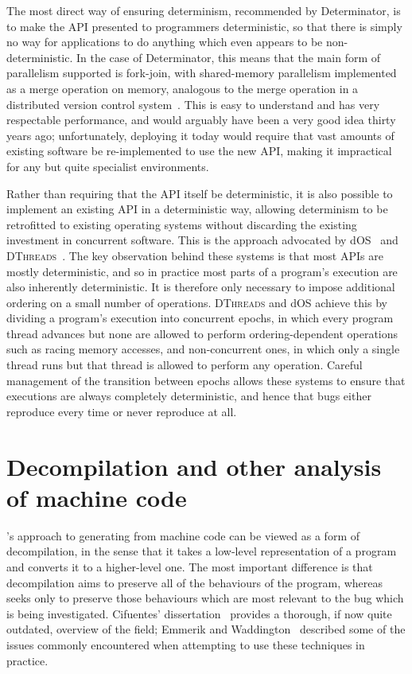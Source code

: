 The most direct way of ensuring determinism, recommended by
Determinator, is to make the API presented to programmers
deterministic, so that there is simply no way for applications to do
anything which even appears to be non-deterministic.  In the case of
Determinator, this means that the main form of parallelism supported
is fork-join, with shared-memory parallelism implemented as a merge
operation on memory, analogous to the merge operation in a distributed
version control system~\cite{Hamano2013}.  This is easy to understand
and has very respectable performance, and would arguably have been a
very good idea thirty years ago; unfortunately, deploying it today
would require that vast amounts of existing software be re-implemented
to use the new API, making it impractical for any but quite specialist
environments.

Rather than requiring that the API itself be deterministic, it is also
possible to implement an existing API in a deterministic way, allowing
determinism to be retrofitted to existing operating systems without
discarding the existing investment in concurrent software.  This is
the approach advocated by dOS~\cite{Bergan2010} and
\textsc{DThreads}~\cite{Liu2011}.  The key observation behind these
systems is that most APIs are mostly deterministic, and so in practice
most parts of a program's execution are also inherently deterministic.
It is therefore only necessary to impose additional ordering on a
small number of operations.  \textsc{DThreads} and dOS achieve this by
dividing a program's execution into concurrent epochs, in which every
program thread advances but none are allowed to perform
ordering-dependent operations such as racing memory accesses, and
non-concurrent ones, in which only a single thread runs but that
thread is allowed to perform any operation.  Careful management of the
transition between epochs allows these systems to ensure that
executions are always completely deterministic, and hence that bugs
either reproduce every time or never reproduce at all.


\section{Decompilation and other analysis of machine code}

{\Technique}'s approach to generating {\StateMachines} from machine
code can be viewed as a form of decompilation, in the sense that it
takes a low-level representation of a program and converts it to a
higher-level one.  The most important difference is that decompilation
aims to preserve all of the behaviours of the program, whereas
{\technique} seeks only to preserve those behaviours which are most
relevant to the bug which is being investigated.  Cifuentes'
dissertation~\cite{Cifuentes1994} provides a thorough, if now quite
outdated, overview of the field; Emmerik and
Waddington~\cite{Emmerik2004} described some of the issues commonly
encountered when attempting to use these techniques in practice.

